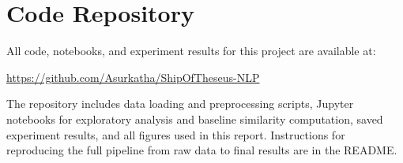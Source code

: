 \section{Code Repository}

All code, notebooks, and experiment results for this project are available at:

\begin{center}
\url{https://github.com/Asurkatha/ShipOfTheseus-NLP}
\end{center}

The repository includes data loading and preprocessing scripts, Jupyter notebooks for exploratory analysis and baseline similarity computation, saved experiment results, and all figures used in this report. Instructions for reproducing the full pipeline from raw data to final results are in the README.
